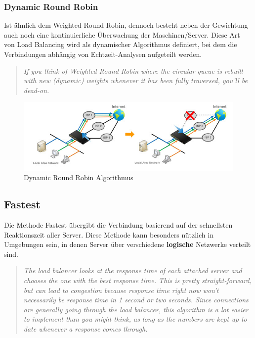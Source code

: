 \newpage

\subsubsection{Dynamic Round Robin}

Ist ähnlich dem Weighted Round Robin, dennoch besteht neben der Gewichtung auch noch eine kontinuierliche Überwachung der Maschinen/Server. Diese Art von Load Balancing wird als dynamischer Algorithmus definiert, bei dem die Verbindungen abhängig von Echtzeit-Analysen aufgeteilt werden.

\begin{quote}
	\textit{If you think of Weighted Round Robin where the circular queue is rebuilt with new (dynamic) weights whenever it has been fully traversed, you’ll be dead-on.}
\end{quote}


\begin{figure}[!h]
	\begin{center}
		\includegraphics[width=0.8\linewidth]{images/lb_prio}
		\caption{Dynamic Round Robin Algorithmus}
		\label{broker}
	\end{center}
\end{figure}


\newpage

\subsection{Fastest}
\label{Fastest}
Die Methode Fastest übergibt die Verbindung basierend auf der schnellsten Reaktionszeit aller Server. Diese Methode kann besonders nützlich in Umgebungen sein, in denen Server über verschiedene \textbf{logische} Netzwerke verteilt sind.

\begin{quote}
	\textit{The load balancer looks at the response time of each attached server and chooses the one with the best response time. This is pretty straight-forward, but can lead to congestion because response time right now won’t necessarily be response time in 1 second or two seconds. Since connections are generally going through the load balancer, this algorithm is a lot easier to implement than you might think, as long as the numbers are kept up to date whenever a response comes through.}
\end{quote}

